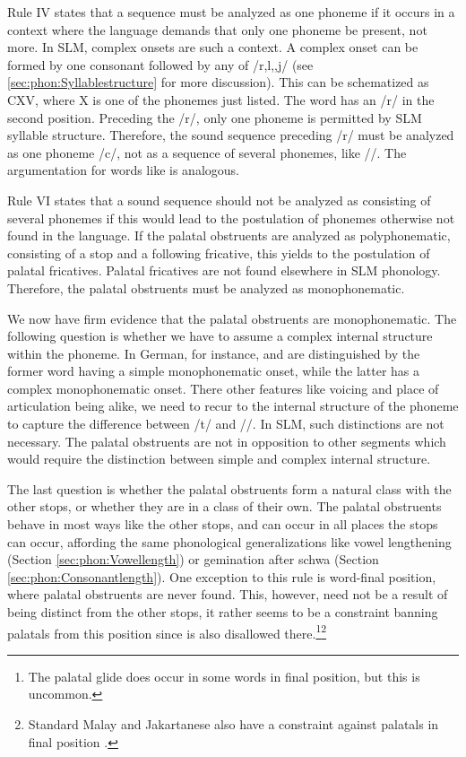 Rule IV states that a sequence must be analyzed as one phoneme if it occurs in a context where the language demands that only one phoneme be present, not more. In SLM, complex onsets are such a context. A complex onset can be formed by one consonant followed by any of /r,l,\V,j/ (see \ref{sec:phon:Syllablestructure} for more discussion). This can be schematized as CXV, where X is one of the phonemes just listed. The word  has an /r/ in the second position. Preceding the /r/, only one phoneme is permitted by SLM syllable structure. Therefore, the sound sequence preceding /r/ must be analyzed as one phoneme /c/, not as a sequence of several phonemes, like /\textctt\textctc/. The argumentation for words like  is analogous.

Rule VI states that a sound sequence should not be analyzed as consisting of several phonemes if this would lead to the postulation of phonemes otherwise not found in the language. If the palatal obstruents are   analyzed as polyphonematic, consisting of a stop and a following fricative, this yields to the postulation of palatal fricatives. Palatal fricatives are not found elsewhere in SLM phonology. Therefore, the palatal obstruents must be analyzed as monophonematic.

We now have  firm evidence that the palatal obstruents are monophonematic. The following question is whether we have to assume a complex internal structure within the phoneme. In German, for instance,  and  are distinguished by the former word having a simple monophonematic onset, while the latter has a complex monophonematic onset. There other features like voicing and place of articulation being alike, we need to recur to the internal structure of the phoneme to capture the difference between /t/ and /\texttslig/. In SLM, such distinctions are not necessary. The palatal obstruents  are not in opposition to other segments which would require the distinction between simple and complex internal structure.

The last question is whether the palatal obstruents form a natural class with the other stops, or whether they are in a class of their own. The palatal obstruents behave in most ways like the other stops, and can occur in all places the stops can occur, affording the same phonological generalizations like vowel lengthening (Section \ref{sec:phon:Vowellength}) or gemination after schwa (Section \ref{sec:phon:Consonantlength}). One exception to this rule is word-final position, where palatal obstruents are never found. This, however, need not be a result of  being distinct from the other stops, it rather seems to be a constraint banning palatals from this position since \ny{} is also disallowed there.\footnote{The palatal glide  does occur in some words in final position, but this is uncommon.}\footnote{Standard Malay and Jakartanese also have a constraint against palatals in final position \citep[12,32]{Adelaar1985}.}

